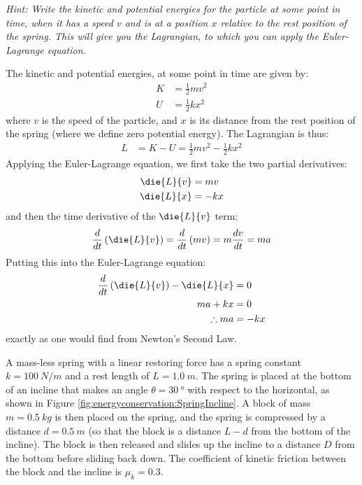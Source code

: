 \textit{Hint: Write the kinetic and potential energies for the particle at some point in time, when it has a speed $v$ and is at a position $x$ relative to the rest position of the spring. This will give you the Lagrangian, to which you can apply the Euler-Lagrange equation.}
\begin{solution}
The kinetic and potential energies, at some point in time are given by:
\begin{align*}
K &=\frac{1}{2}mv^2\\
U &=\frac{1}{2}kx^2
\end{align*}
where $v$ is the speed of the particle, and $x$ is its distance from the rest position of the spring (where we define zero potential energy). The Lagrangian is thus:
\begin{align*}
L&=K-U=\frac{1}{2}mv^2-\frac{1}{2}kx^2
\end{align*}
Applying the Euler-Lagrange equation, we first take the two partial derivatives:
\begin{align*}
\die{L}{v} &= mv\\
\die{L}{x} &= -kx
\end{align*}
and then the time derivative of the $\die{L}{v}$ term:
\begin{align*}
\frac{d}{dt}\left(\die{L}{v}\right) =\frac{d}{dt}\left(mv\right)=m\frac{dv}{dt}=ma
\end{align*}
Putting this into the Euler-Lagrange equation:
\begin{align*}
\frac{d}{dt}\left(\die{L}{v}\right)-\die{L}{x}&=0\\
ma + kx &=0\\
\therefore ma&=-kx
\end{align*}
exactly as one would find from Newton's Second Law.
\end{solution}


\question A mass-less spring with a linear restoring force has a spring constant $k=\SI{100}{N/m}$ and a rest length of $L=\SI{1.0}{m}$. The spring is placed at the bottom of an incline that makes an angle $\theta=\SI{30}{\degree}$ with respect to the horizontal, as shown in Figure \ref{fig:energyconservation:SpringIncline}. A block of mass $m=\SI{0.5}{kg}$ is then placed on the spring, and the spring is compressed by a distance $d=\SI{0.5}{m}$ (so that the block is a distance $L-d$ from the bottom of the incline). The block is then released and slides up the incline to a distance $D$ from the bottom before sliding back down. The coefficient of kinetic friction between the block and the incline is $\mu_k=\num{0.3}$. 


